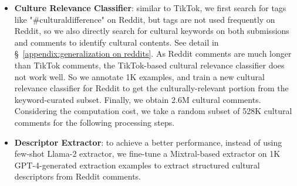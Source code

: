 \documentclass{article} %
\newcommand{\ryan}[1]{\textcolor{magenta}{[#1 --Ryan]}}
\newcommand{\yutong}[1]{\textcolor{orange}{[#1 --Yutong]}}
\begin{document}
\begin{itemize}
    \item \textbf{Culture Relevance Classifier}: similar to TikTok, we first search for tags like "\#culturaldifference" on Reddit, but tags are not used frequently on Reddit, so we also directly search for cultural keywords on both submissions and comments to identify cultural contents. See detail in \S~\ref{appendix:generalization on reddits}.  %
    As Reddit comments are much longer than TikTok comments, the TikTok-based cultural relevance classifier does not work well. %
    So we %
    annotate 1K examples, and train a new cultural relevance classifier for Reddit to get the culturally-relevant portion from the keyword-curated subset. Finally, we obtain 2.6M cultural comments. Considering the computation cost, we take a random subset of 528K cultural comments for the following processing steps. %
    

    \item \textbf{Descriptor Extractor}: to achieve a better performance, instead of using few-shot Llama-2 extractor, we fine-tune a Mixtral-based extractor on 1K GPT-4-generated extraction examples to extract structured cultural descriptors from Reddit comments. 
\end{itemize}
\end{document}
